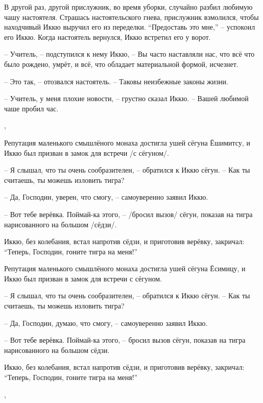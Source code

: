 \begin{ver}[1]
В другой раз, другой прислужник, во время уборки, случайно разбил любимую чашу
настоятеля. Страшась настоятельского гнева, прислужник
взмолился, чтобы находчивый Иккю выручил его из переделки.
``Предоставь это мне,'' -- успокоил его Иккю.
Когда настоятель вернулся, Иккю встретил его у ворот.

-- Учитель, -- подступился к нему
Иккю, -- Вы часто наставляли нас, что всё что было рождено, умрёт, и
всё, что обладает материальной формой,
исчезнет.

-- Это так, -- отозвался настоятель. -- Таковы неизбежные
законы жизни.

-- Учитель, у меня плохие новости, -- грустно сказал Иккю.
-- Вашей любимой чаше пробил час.
\end{ver}
\sep

\begin{ver}
Репутация маленького смышлёного монаха достигла ушей сёгуна
Ёшимитсу, и Иккю был призван в замок для встречи /с сёгуном/.

-- Я слышал, что ты очень сообразителен, -- обратился к Иккю
сёгун. -- Как ты считаешь, ты можешь изловить тигра?

-- Да, Господин, уверен, что смогу, -- самоуверенно заявил
Иккю.

-- Вот тебе верёвка. Поймай-ка этого, -- /бросил
вызов/ сёгун, показав на тигра нарисованного на
большом /сёдзи/.

Иккю, без колебания, встал напротив сёдзи, и приготовив верёвку,
закричал: ``Теперь, Господин, гоните тигра на меня!''
\end{ver}

\begin{ver}[1]
Репутация маленького смышлёного монаха достигла ушей сёгуна
Ёсимицу, и Иккю был призван в замок для встречи с сёгуном.

-- Я слышал, что ты очень сообразителен, -- обратился к Иккю сёгун. --
   Как ты считаешь, ты можешь изловить тигра?

-- Да, Господин, думаю, что смогу, -- самоуверенно заявил Иккю.

-- Вот тебе верёвка. Поймай-ка этого, -- бросил вызов сёгун, показав
   на тигра нарисованного на большом сёдзи.

Иккю, без колебания, встал напротив сёдзи, и приготовив верёвку,
закричал: ``Теперь, Господин, гоните тигра на меня!''
\end{ver}
\sep

